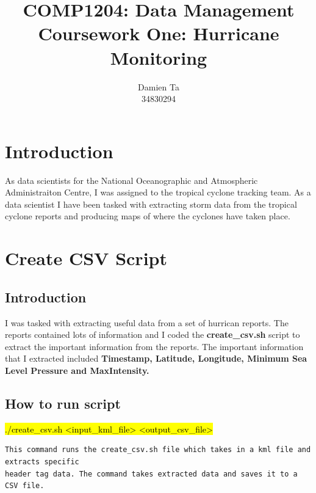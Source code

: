 \documentclass[]{article}
\title{COMP1204: Data Management \\ Coursework One: Hurricane Monitoring }
\author{Damien Ta \\ 34830294}
\begin{document}
\maketitle

\section{Introduction}
As data scientists for the National Oceanographic and Atmospheric Administraiton Centre, I was assigned to the tropical cyclone
tracking team. As a data scientist I have been tasked with extracting storm data from the tropical cyclone reports and producing
maps of where the cyclones have taken place.
\clearpage
\section{Create CSV Script}
\subsection{Introduction}
I was tasked with extracting useful data from a set of hurrican reports.
The reports contained lots of information and I coded the \textbf{create\_csv.sh}
script to extract the important information from the reports.
The important information that I extracted included \textbf{Timestamp, Latitude,
Longitude, Minimum Sea Level Pressure and MaxIntensity.}
\subsection{How to run script}
\begin{tcolorbox}[colback=white, colframe=black, boxrule=1pt, arc=2mm, 
    title=Script to run create\_csv.sh, width=6.7in, fonttitle=\bfseries, listing only, listing options={language=sh, basicstyle=\ttfamily}]
\hl{./create\_csv.sh <input\_kml\_file> <output\_csv\_file>}
\begin{verbatim}
This command runs the create_csv.sh file which takes in a kml file and extracts specific
header tag data. The command takes extracted data and saves it to a CSV file.
\end{verbatim}
\end{tcolorbox}
\end{document}
